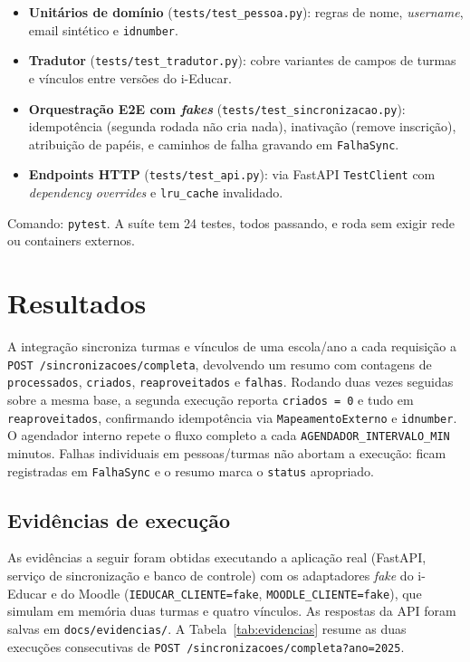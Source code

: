 \documentclass[
	12pt,
	oneside,
	a4paper,
	chapter=TITLE,
	section=TITLE,
	sumario=tradicional,
	english,
	brazil
]{abntex2}
\begin{document}
\begin{itemize}
    \item \textbf{Unitários de domínio} (\texttt{tests/test\_pessoa.py}): regras de nome,
    \emph{username}, email sintético e \texttt{idnumber}.
    \item \textbf{Tradutor} (\texttt{tests/test\_tradutor.py}): cobre variantes de campos
    de turmas e vínculos entre versões do i-Educar.
    \item \textbf{Orquestração E2E com \emph{fakes}} (\texttt{tests/test\_sincronizacao.py}):
    idempotência (segunda rodada não cria nada), inativação (remove inscrição),
    atribuição de papéis, e caminhos de falha gravando em \texttt{FalhaSync}.
    \item \textbf{Endpoints HTTP} (\texttt{tests/test\_api.py}): via FastAPI
    \texttt{TestClient} com \emph{dependency overrides} e \texttt{lru\_cache} invalidado.
\end{itemize}

Comando: \texttt{pytest}. A suíte tem 24 testes, todos passando, e roda sem exigir rede
ou containers externos.

\chapter{Resultados}

A integração sincroniza turmas e vínculos de uma escola/ano a cada requisição a
\texttt{POST /sincronizacoes/completa}, devolvendo um resumo com contagens de
\texttt{processados}, \texttt{criados}, \texttt{reaproveitados} e \texttt{falhas}. Rodando
duas vezes seguidas sobre a mesma base, a segunda execução reporta \texttt{criados = 0} e
tudo em \texttt{reaproveitados}, confirmando idempotência via \texttt{MapeamentoExterno} e
\texttt{idnumber}. O agendador interno repete o fluxo completo a cada
\texttt{AGENDADOR\_INTERVALO\_MIN} minutos. Falhas individuais em pessoas/turmas não
abortam a execução: ficam registradas em \texttt{FalhaSync} e o resumo marca o
\texttt{status} apropriado.

\section{Evidências de execução}

As evidências a seguir foram obtidas executando a aplicação real (FastAPI, serviço de
sincronização e banco de controle) com os adaptadores \emph{fake} do i-Educar e do Moodle
(\texttt{IEDUCAR\_CLIENTE=fake}, \texttt{MOODLE\_CLIENTE=fake}), que simulam em memória
duas turmas e quatro vínculos. As respostas da API foram salvas em
\texttt{docs/evidencias/}. A Tabela~\ref{tab:evidencias} resume as duas execuções
consecutivas de \texttt{POST /sincronizacoes/completa?ano=2025}.
\end{document}
